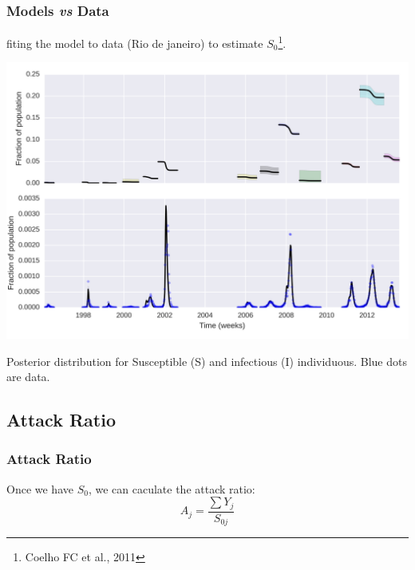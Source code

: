 \documentclass[10pt,compress,notheorems]{beamer}
\begin{document}
\begin{frame}[fragile]
\frametitle{Models \textit{vs} Data}
fiting the model to data (Rio de janeiro) to estimate $S_0$\footnote{Coelho 
FC et al., 2011}.

 \includegraphics[width=\textwidth]{concat_SI.png}
 
 \begin{small}Posterior distribution for Susceptible (S) and infectious (I) 
individuous. Blue dots are data. \end{small}

\end{frame}

\subsection{Attack Ratio}
\begin{frame}
\frametitle{Attack Ratio}
Once we have $S_0$, we can caculate the attack ratio:
\begin{equation}
\label{eq:AR2}
 A_{j}=\frac{\sum Y_j}{S_{0j}}
\end{equation}
\end{frame}
\end{document}
